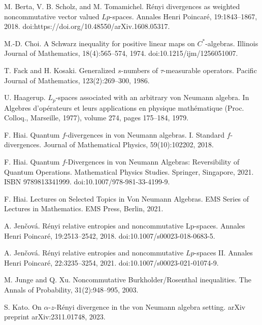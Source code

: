\documentclass[12pt]{article}
\theoremstyle{definition}
\theoremstyle{remark}
\numberwithin{equation}{section}
\begin{document}
%
%
\begin{thebibliography}{99}
M. Berta, V. B. Scholz, and M. Tomamichel. R\'enyi divergences as weighted noncommutative
vector valued $Lp$-spaces. Annales Henri Poincar\'e, 19:1843--1867, 2018.
doi:https://doi.org/10.48550/arXiv.1608.05317.

M.-D. Choi. A Schwarz inequality for positive linear maps on $C^*$-algebras. Illinois Journal
of Mathematics, 18(4):565--574, 1974. doi:10.1215/ijm/1256051007.

T. Fack and H. Kosaki. Generalized $s$-numbers of $\tau$-measurable operators. Pacific Journal
of Mathematics, 123(2):269--300, 1986.

U. Haagerup. $L_p$-spaces associated with an arbitrary von Neumann algebra. In Algebres
d’op\'erateurs et leurs applications en physique mathématique (Proc. Colloq., Marseille, 1977),
volume 274, pages 175--184, 1979.

F. Hiai. Quantum $f$-divergences in von Neumann algebras. I. Standard $f$-divergences. Journal
of Mathematical Physics, 59(10):102202, 2018.

F. Hiai. Quantum $f$-Divergences in von Neumann Algebras: Reversibility of Quantum Operations.
Mathematical Physics Studies. Springer, Singapore, 2021. ISBN 9789813341999.
doi:10.1007/978-981-33-4199-9.

F. Hiai. Lectures on Selected Topics in Von Neumann Algebras. EMS Series of Lectures in Mathematics.
EMS Press, Berlin, 2021.

A. Jen\v cov\'a. R\'enyi relative entropies and noncommutative Lp-spaces. Annales Henri Poincar\'e,
19:2513--2542, 2018. doi:10.1007/s00023-018-0683-5.

A. Jen\v cov\'a. R\'enyi relative entropies and noncommutative $Lp$-spaces II. Annales Henri
Poincar\'e, 22:3235--3254, 2021. doi:10.1007/s00023-021-01074-9.

M. Junge and Q. Xu. Noncommutative Burkholder/Rosenthal inequalities. The Annals of
Probability, 31(2):948--995, 2003.

S. Kato. On $\alpha$-$z$-R\'enyi divergence in the von Neumann algebra setting. arXiv preprint
arXiv:2311.01748, 2023.


\end{thebibliography}
\end{document}
